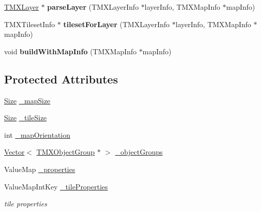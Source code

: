 \begin{DoxyCompactItemize}
\item 
\mbox{\label{classexperimental_1_1TMXTiledMap_a91b31eba1466485c468918ff23f4ca6a}} 
\hyperlink{classexperimental_1_1TMXLayer}{T\+M\+X\+Layer} $\ast$ {\bfseries parse\+Layer} (T\+M\+X\+Layer\+Info $\ast$layer\+Info, T\+M\+X\+Map\+Info $\ast$map\+Info)
\item 
\mbox{\label{classexperimental_1_1TMXTiledMap_ad1e51dc17b29d4049f8fcfcbb10e6468}} 
T\+M\+X\+Tileset\+Info $\ast$ {\bfseries tileset\+For\+Layer} (T\+M\+X\+Layer\+Info $\ast$layer\+Info, T\+M\+X\+Map\+Info $\ast$map\+Info)
\item 
\mbox{\label{classexperimental_1_1TMXTiledMap_a657bd5b0430453e28db16337e6a315a8}} 
void {\bfseries build\+With\+Map\+Info} (T\+M\+X\+Map\+Info $\ast$map\+Info)
\end{DoxyCompactItemize}
\subsection*{Protected Attributes}
\begin{DoxyCompactItemize}
\item 
\hyperlink{classSize}{Size} \hyperlink{classexperimental_1_1TMXTiledMap_a75abce1666e8430273ef914243e554e2}{\+\_\+map\+Size}
\item 
\hyperlink{classSize}{Size} \hyperlink{classexperimental_1_1TMXTiledMap_ab7f86e9a30c42c0b631651a9096ecea1}{\+\_\+tile\+Size}
\item 
int \hyperlink{classexperimental_1_1TMXTiledMap_ae696c0e5c2befb7cc07d2542353a36a2}{\+\_\+map\+Orientation}
\item 
\hyperlink{classVector}{Vector}$<$ \hyperlink{classTMXObjectGroup}{T\+M\+X\+Object\+Group} $\ast$ $>$ \hyperlink{classexperimental_1_1TMXTiledMap_a4f95a1b37b1b0ac9d953b7fb5f2b4d1a}{\+\_\+object\+Groups}
\item 
Value\+Map \hyperlink{classexperimental_1_1TMXTiledMap_a83f1a2a8df110f2c755d9a1ae4490f3e}{\+\_\+properties}
\item 
\mbox{\label{classexperimental_1_1TMXTiledMap_a2de86f45817cae4788ec2feeaf9f8246}} 
Value\+Map\+Int\+Key \hyperlink{classexperimental_1_1TMXTiledMap_a2de86f45817cae4788ec2feeaf9f8246}{\+\_\+tile\+Properties}
\begin{DoxyCompactList}\small\item\em tile properties \end{DoxyCompactList}\end{DoxyCompactItemize}

